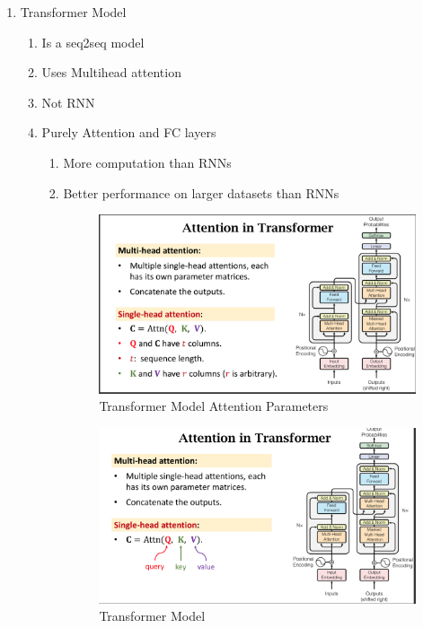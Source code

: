 \documentclass[11pt]{article}
\begin{document}
\begin{enumerate}
\item Transformer Model

\begin{enumerate}
\item Is a seq2seq model
\item Uses Multihead attention
\item Not RNN
\item Purely Attention and FC layers
\begin{enumerate}
\item More computation than RNNs
\item Better performance on larger datasets than RNNs

\begin{figure}[ht!]
\centering
\includegraphics[width=15cm]{./pictures/transformer_params.png}
\caption{\label{fig:org3f297a3}
Transformer Model Attention Parameters}
\end{figure}

\begin{figure}[ht!]
\centering
\includegraphics[width=15cm]{./pictures/transformer.png}
\caption{\label{fig:org7f82718}
Transformer Model}
\end{figure}
\end{enumerate}
\end{enumerate}
\end{enumerate}
\end{document}
